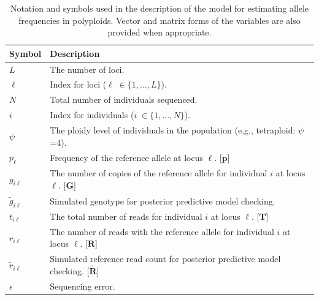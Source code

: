 \documentclass[11pt,english,letterpaper,oneside]{article}
\begin{document}
\begin{table}
\centering
{}
\caption{Notation and symbols used in the description of the model for estimating allele frequencies in polyploids. Vector and matrix forms of the variables are also provided when appropriate.}
\vspace{0.25in}
\bgroup
\def\arraystretch{1.45}
\begin{tabular}[l]{l | l}
\hline
\textbf{Symbol} & \textbf{Description}\\ \hline
$L$ & The number of loci. \\
$\ell$ & Index for loci ($\ell\; \in \{1,\ldots,L\}$). \\
$N$ & Total number of individuals sequenced. \\
$i$ & Index for individuals ($i\; \in \{1,\ldots,N\}$). \\
$\psi$ & The ploidy level of individuals in the population (e.g., tetraploid: $\psi$=4). \\
$p_{\ell}$ & Frequency of the reference allele at locus $\ell$. [$\bm{p}$] \\
$g_{i \ell}$ & The number of copies of the reference allele for individual $i$ at locus $\ell$. [$\bm{G}$] \\
$\tilde{g}_{i \ell}$ & Simulated genotype for posterior predictive model checking. \\
$t_{i \ell}$ & The total number of reads for individual $i$ at locus $\ell$. [$\bm{T}$] \\
$r_{i \ell}$ & The number of reads with the reference allele for individual $i$ at locus $\ell$. [$\bm{R}$] \\
$\tilde{r}_{i \ell}$ & Simulated reference read count for posterior predictive model checking. [$\tilde{\bm{R}}$] \\
$\epsilon$ & Sequencing error. \\
\hline
\end{tabular}
\egroup
\label{table1}
\vspace{0.25in}
\end{table}

\end{document}
